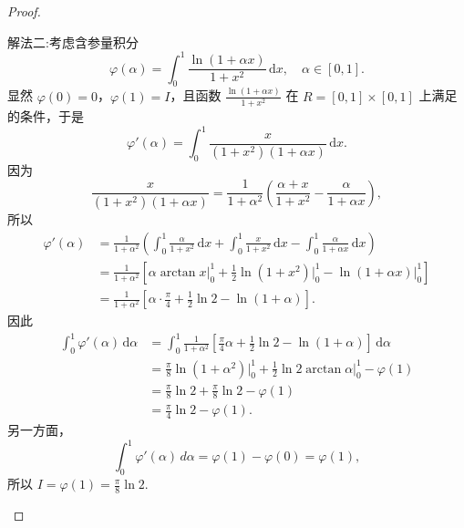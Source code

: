 \documentclass[../../main.tex]{subfiles}
\begin{document}
\begin{proof}
\begin{enumerate}
{\color{blue}解法二:}考虑含参量积分
\[
\varphi(\alpha) = \int_{0}^{1} \frac{\ln(1 + \alpha x)}{1 + x^2} \, \mathrm{d}x, \quad \alpha \in [0,1].
\]
显然 \( \varphi(0) = 0 \)，\( \varphi(1) = I \)，且函数 \( \frac{\ln(1 + \alpha x)}{1 + x^2} \) 在 \( R = [0,1] \times [0,1] \) 上满足 的条件，于是
\[
\varphi'(\alpha) = \int_{0}^{1} \frac{x}{(1 + x^2)(1 + \alpha x)} \, \mathrm{d}x.
\]
因为
\[
\frac{x}{(1 + x^2)(1 + \alpha x)} = \frac{1}{1 + \alpha^2} \left( \frac{\alpha + x}{1 + x^2} - \frac{\alpha}{1 + \alpha x} \right),
\]
所以
\begin{align*}
\varphi' \left( \alpha \right) &=\frac{1}{1+\alpha ^2}\left( \int_0^1{\frac{\alpha}{1+x^2}\,\mathrm{d}x}+\int_0^1{\frac{x}{1+x^2}\,\mathrm{d}x}-\int_0^1{\frac{\alpha}{1+\alpha x}\,\mathrm{d}x} \right) 
\\
&=\frac{1}{1+\alpha ^2}\left[ \alpha \arctan  x\Big|_{0}^{1}+\frac{1}{2}\ln \left( 1+x^2 \right) \Big|_{0}^{1}-\ln \left( 1+\alpha x \right) \Big|_{0}^{1} \right] 
\\
&=\frac{1}{1+\alpha ^2}\left[ \alpha \cdot \frac{\pi}{4}+\frac{1}{2}\ln 2-\ln \left( 1+\alpha \right) \right] .
\end{align*}
因此
\begin{align*}
\int_0^1{\varphi' \left( \alpha \right) \,\mathrm{d}\alpha}&=\int_0^1{\frac{1}{1+\alpha ^2}\left[ \frac{\pi}{4}\alpha +\frac{1}{2}\ln 2-\ln \left( 1+\alpha \right) \right] \,\mathrm{d}\alpha}
\\
&=\frac{\pi}{8}\ln \left( 1+\alpha ^2 \right) \Big|_{0}^{1}+\frac{1}{2}\ln 2\arctan  \alpha \Big|_{0}^{1}-\varphi \left( 1 \right) 
\\
&=\frac{\pi}{8}\ln 2+\frac{\pi}{8}\ln 2-\varphi \left( 1 \right) 
\\
&=\frac{\pi}{4}\ln 2-\varphi \left( 1 \right) .
\end{align*}
另一方面，
\[
\int_{0}^{1} \varphi'(\alpha) \, d\alpha = \varphi(1) - \varphi(0) = \varphi(1),
\]
所以 \( I = \varphi(1) = \frac{\pi}{8} \ln 2 \).
\end{enumerate}

\end{proof}
\end{document}
